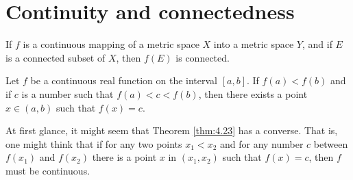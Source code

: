 
\section{Continuity and connectedness}
\begin{thm}
    \label{thm:4.22}
    If $f$ is a continuous mapping of a metric space $X$ into a metric space $Y$, 
    and if $E$ is a connected subset of $X$, then $f(E)$ is connected.
\end{thm}

\begin{thm}
    \label{thm:4.23}
    Let $f$ be a continuous real function on the interval $[a, b]$. 
    If $f(a) <f(b)$ and if $c$ is a number such that $f(a) < c < f(b)$, 
    then there exists a point $x \in (a, b)$ such that $f(x) = c$.
\end{thm}

\begin{myremark}
    \label{myremark:4.24}
    At first glance, it might seem that Theorem \ref{thm:4.23} has a converse.
    That is, one might think that if for any two points $x_1 < x_2$ 
    and for any number $c$ between $f(x_1)$ and $f(x_2)$ 
    there is a point $x$ in $(x_1 , x_2)$ such that $f(x) = c$, 
    then $f$ must be continuous.
\end{myremark}